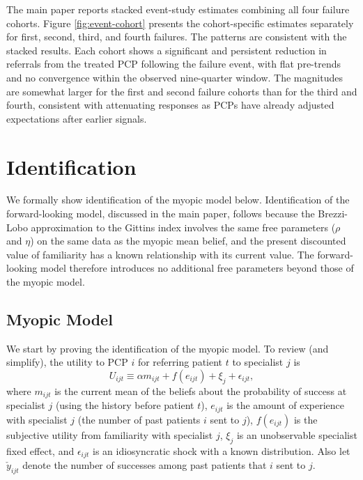\documentclass[12pt]{article}
\begin{document}
The main paper reports stacked event-study estimates combining all four failure cohorts. Figure \ref{fig:event-cohort} presents the cohort-specific estimates separately for first, second, third, and fourth failures. The patterns are consistent with the stacked results. Each cohort shows a significant and persistent reduction in referrals from the treated PCP following the failure event, with flat pre-trends and no convergence within the observed nine-quarter window. The magnitudes are somewhat larger for the first and second failure cohorts than for the third and fourth, consistent with attenuating responses as PCPs have already adjusted expectations after earlier signals.



\section{Identification} \label{app:identification}

We formally show identification of the myopic model below. Identification of the forward-looking model, discussed in the main paper, follows because the Brezzi-Lobo approximation to the Gittins index involves the same free parameters ($\rho$ and $\eta$) on the same data as the myopic mean belief, and the present discounted value of familiarity has a known relationship with its current value. The forward-looking model therefore introduces no additional free parameters beyond those of the myopic model.


\subsection{Myopic Model}

We start by proving the identification of the myopic model.
To review (and simplify), the utility to PCP $i$ for referring patient $t$ to specialist $j$ is
\[
U_{ijt} \equiv \alpha m_{ijt} + f(e_{ijt}) + \xi_j + \epsilon_{ijt},
\]
where $m_{ijt}$ is the current mean of the beliefs about the probability of success at specialist $j$ (using the history before patient $t$), $e_{ijt}$ is the amount of experience with specialist $j$ (the number of past patients $i$ sent to $j$), $f(e_{ijt})$ is the subjective utility from familiarity with specialist $j$, $\xi_j$ is an unobservable specialist fixed effect, and $\epsilon_{ijt}$ is an idiosyncratic shock with a known distribution.
Also let $\check y_{ijt}$ denote the number of successes among past patients that $i$ sent to $j$.
\end{document}
